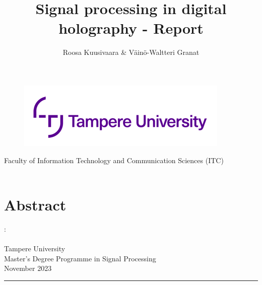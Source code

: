 \documentclass[12pt,a4paper,english
]{tunithesis}
\author{Roosa Kuusivaara \& Väinö-Waltteri Granat}
\title{Signal processing in digital holography - Report} %
\begin{document}
\makeatletter

\thispagestyle{empty}
\vspace*{-.5cm}\noindent

\begin{figure}
    \vspace{-1.3cm}
    \advance\leftskip-2.5cm
    \noindent\includegraphics{img/tunilogo.png}
\end{figure}
 
\vspace{2.5cm}
\begin{flushright}
\noindent\textsf{\LARGE{\@author}}

\noindent\vspace{0.5cm}

\noindent\Huge{\textsf{\textbf{\textcolor{tunipurple}{\@title}}}}
\end{flushright}
\vspace{13.7cm} %

\begin{flushright}  
    \begin{spacing}{1.0}
      \textsf{Faculty of Information Technology and Communication Sciences (ITC)\\
      \@thesistype\\}
    \end{spacing}
\end{flushright}

\if@twoside
\clearpage
\fi



\chapter*{Abstract}
\begin{spacing}{1.0}
\noindent \@author: \@title\\
\@thesistype\\
Tampere University\\
Master’s Degree Programme in Signal Processing\\
November 2023 \\
\end{spacing}
\noindent\rule{12cm}{0.4pt}
\end{document}
